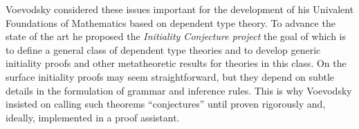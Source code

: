 \documentclass{easychair}
\begin{document}
Voevodsky considered these issues important for the development of his Univalent Foundations of Mathematics based on dependent type theory. To advance the state
of the art he proposed the {\em Initiality Conjecture project} the goal of which is to define a general class of dependent type theories and to develop generic initiality proofs and other metatheoretic results for theories in this class. 
On the surface initiality proofs may seem straightforward, but they depend on subtle details in the formulation of grammar and inference rules. This is why Voevodsky insisted on calling such theorems ``conjectures'' until proven rigorously and, ideally, implemented in a proof assistant.

\end{document}
